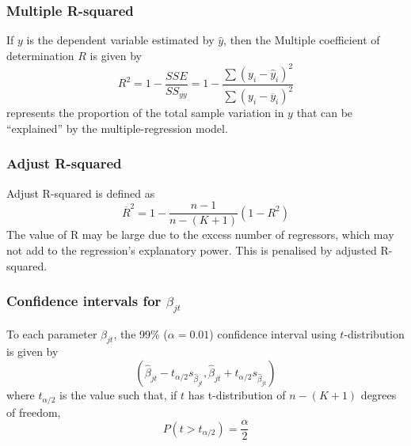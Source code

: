 \documentclass[12pt]{article}
\begin{document}
\subsubsection{{Multiple R-squared}} If $y$ is the dependent variable estimated by $\hat y$, then the Multiple coefficient of determination $R$ is given by $$R^2=1-\frac{SSE}{SS_{yy}}=1-\frac{\sum {(y_i-\hat y_i)^2}}{\sum {(y_i- \overline{y}_i)^2}}$$ 
represents  the  proportion  of  the  total  sample  variation  in  $y$  that  can  be  ``explained'' by the multiple-regression model.
\subsubsection{{Adjust R-squared}} Adjust R-squared is defined as $$\overline{R} ^2=1-\frac{n-1}{n-(K+1)}(1-R^2)$$
The value of R may be large due to the excess number of regressors, which may not add to the regression's explanatory power. This is penalised by adjusted R-squared. 

\subsubsection{Confidence intervals for $\beta_{jt}$}
To each parameter $\beta_{jt}$, the 99\% ($\alpha = 0.01$) confidence interval using $t$-distribution is given by
$$(\hat \beta_{jt}-t_{\alpha/2}s_{\hat \beta_{jt}}, \hat \beta_{jt}+t_{\alpha/2}s_{\hat \beta_{jt}})$$
where $t_{\alpha/2}$ is the value such that, if $t$ has t-distribution of $n-(K+1)$ degrees of freedom, 
$$P(t>t_{\alpha/2})=\frac{\alpha}{2}$$
\end{document}
